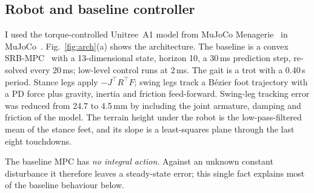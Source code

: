 \documentclass[conference]{IEEEtran}
\begin{document}
\subsection{Robot and baseline controller}
I used the torque-controlled Unitree~A1 model from MuJoCo
Menagerie~\cite{menagerie} in MuJoCo~\cite{todorov2012}.
Fig.~\ref{fig:arch}(a) shows the architecture. The baseline is
a convex SRB-MPC~\cite{dicarlo2018} with a 13-dimensional state, horizon
10, a 30\,ms prediction step, re-solved every 20\,ms; low-level control
runs at 2\,ms. The gait is a trot with a 0.40\,s period. Stance legs
apply $-J^\top R^\top F$; swing legs track a B\'ezier foot trajectory
with a PD force plus gravity, inertia and friction feed-forward.
Swing-leg tracking error was reduced from 24.7 to 4.5\,mm by including
the joint armature, damping and friction of the model. The terrain
height under the robot is the low-pass-filtered mean of the stance feet,
and its slope is a least-squares plane through the last eight
touchdowns.

The baseline MPC has \emph{no integral action}. Against an unknown
constant disturbance it therefore leaves a steady-state error; this
single fact explains most of the baseline behaviour below.
\end{document}
